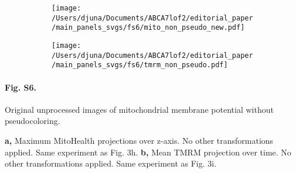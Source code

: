% 
% 
\begin{figure}[H]
        \begin{subfigure}[t]{0.7\textwidth}
            \caption{}
            \texttt{[image: /Users/djuna/Documents/ABCA7lof2/editorial\_paper/main\_panels\_svgs/fs6/mito\_non\_pseudo\_new.pdf]}        
        \end{subfigure}
        \begin{subfigure}[t]{0.45\textwidth}
            \caption{}
            \texttt{[image: /Users/djuna/Documents/ABCA7lof2/editorial\_paper/main\_panels\_svgs/fs6/tmrm\_non\_pseudo.pdf]}        
        \end{subfigure}
\end{figure}
\paragraph*{Fig. S6.} Original unprocessed images of mitochondrial membrane potential without pseudocoloring.
{}
\textbf{a,} Maximum MitoHealth projections over z-axis. No other transformations applied. Same experiment as Fig. 3h.
\textbf{b,} Mean TMRM projection over time. No other transformations applied. Same experiment as Fig. 3i.

